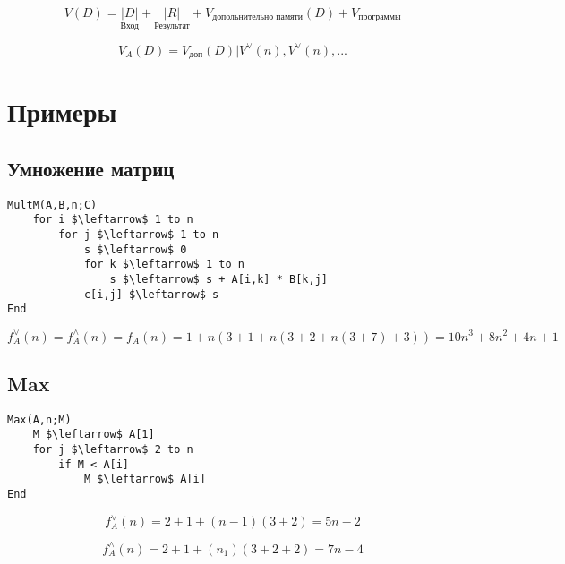 \documentclass[a4paper, 14pt]{report}
\begin{document}
$$
V(D) = \underset{\text{Вход}}{|D|} + \underset{\text{Результат}}{|R|} + V_\text{допольнительно памяти}(D) + V_\text{программы}
$$

$$
V_A(D) = V_\text{доп}(D) | V^\vee(n), V^\vee(n), ...
$$

\chapter{Примеры}

\section{Умножение матриц}

\begin{lstlisting}
MultM(A,B,n;C)
    for i $\leftarrow$ 1 to n
        for j $\leftarrow$ 1 to n
            s $\leftarrow$ 0
            for k $\leftarrow$ 1 to n
                s $\leftarrow$ s + A[i,k] * B[k,j]
            c[i,j] $\leftarrow$ s
End
\end{lstlisting}

$$
f^\vee_A(n) = f^\wedge_A(n)=f_A(n) = 1 + n (3 + 1 + n (3 + 2 + n (3 + 7) + 3)) =
10 n^3 + 8n^2 + 4n + 1
$$

\section{Max}

\begin{lstlisting}
Max(A,n;M)
    M $\leftarrow$ A[1]
    for j $\leftarrow$ 2 to n
        if M < A[i]
            M $\leftarrow$ A[i]
End
\end{lstlisting}

$$
f^\vee_A(n) = 2 + 1 + (n-1) (3+2) = 5n - 2
$$

$$
f^\wedge_A(n) = 2 + 1 + (n_1) (3+2+2) = 7n - 4
$$
\end{document}
